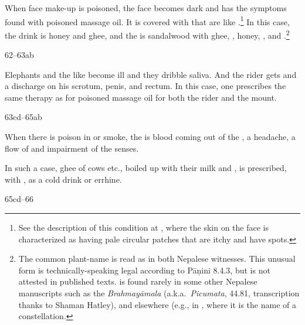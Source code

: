 \begin{translation}
 When face make-up is poisoned, the face becomes dark and has  the symptoms 
 found
with poisoned massage oil. It is covered with  that are like
.\footnote{See the description of this condition
at , where the skin on the face is characterized as having pale
circular patches that are itchy and have spots.}  In this case, the drink is
honey and ghee, and the  is sandalwood %
with ghee, , honey, , %
and .\footnote{The common plant-name 
 is
read as  in both Nepalese witnesses.  This unusual form is
technically-speaking legal according to Pāṇini 8.4.3, but is not attested in
published texts.   is found rarely in some other Nepalese
manuscripts such as the \emph{Brahmayāmala} (a.k.a.\ \emph{Picumata}, 44.81,
transcription thanks to Shaman Hatley), and elsewhere (e.g., in
\cite[20]{gana-1920}, where it is the name of a constellation.} %
 
\item[62--63ab] 

Elephants and the like become ill and they dribble saliva. And the rider gets
 and a discharge on his scrotum, penis, and rectum. In this
case, one prescribes the same therapy as for poisoned massage oil for both the
rider and the mount.

\item[63cd--65ab]

When there is poison in  or smoke, the  is
blood coming out of the , a headache, a flow of
 and impairment of the senses.

In such a case, 
ghee of cows etc., boiled up with their milk
and ,
is prescribed, with
,
 as a cold drink or errhine.

\item[65cd--66]


\end{translation}
